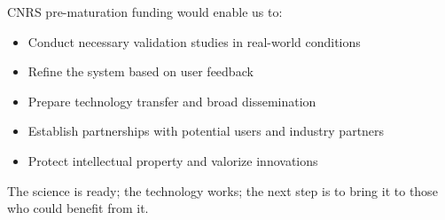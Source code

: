 CNRS pre-maturation funding would enable us to:
\begin{itemize}
    \item Conduct necessary validation studies in real-world conditions
    \item Refine the system based on user feedback
    \item Prepare technology transfer and broad dissemination
    \item Establish partnerships with potential users and industry partners
    \item Protect intellectual property and valorize innovations
\end{itemize}

The science is ready; the technology works; the next step is to bring it to those who could benefit from it.
